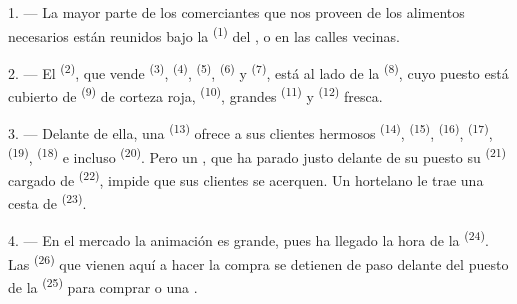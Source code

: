 
\VUsaut{4.0mm}
\VUsaut{3.0mm}

\VUsaut{3.0mm}

1. --- La mayor parte de los comerciantes que nos proveen de los alimentos
necesarios están reunidos bajo la  \textsuperscript{(1)} del
, o en las calles vecinas.

2. --- El  \textsuperscript{(2)}, que vende 
\textsuperscript{(3)},  \textsuperscript{(4)}, 
\textsuperscript{(5)},  \textsuperscript{(6)} y 
\textsuperscript{(7)}, está al lado de la 
\textsuperscript{(8)}, cuyo puesto está cubierto de 
\textsuperscript{(9)} de corteza roja,  \textsuperscript{(10)}, grandes
 \textsuperscript{(11)} y 
\textsuperscript{(12)} fresca.

3. --- Delante de ella, una  \textsuperscript{(13)} ofrece a sus
clientes hermosos  \textsuperscript{(14)}, 
\textsuperscript{(15)},  \textsuperscript{(16)}, 
\textsuperscript{(17)},  \textsuperscript{(19)}, 
\textsuperscript{(18)} e incluso  \textsuperscript{(20)}. Pero un
, que ha parado justo delante de su puesto su
 \textsuperscript{(21)} cargado de  \textsuperscript{(22)}, impide que sus clientes se acerquen. Un hortelano
le trae una cesta de  \textsuperscript{(23)}.

\VUsaut{4.0mm}
\VUsaut{3.0mm}

4. --- En el mercado la animación es grande, pues ha llegado la hora de la
 \textsuperscript{(24)}. Las  \textsuperscript{(26)} que
vienen aquí a hacer la compra se detienen de paso delante del puesto de la
 \textsuperscript{(25)} para comprar  o una
.

